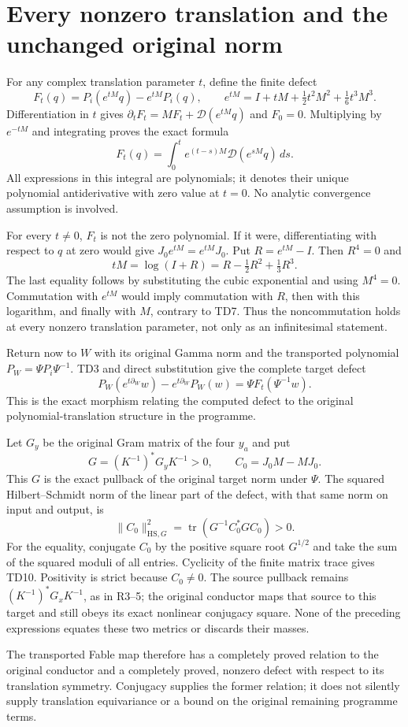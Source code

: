 \documentclass[11pt]{article}
\newcommand{\tr}{\operatorname{tr}}
\begin{document}
\section{Every nonzero translation and the unchanged original norm}
For any complex translation parameter $t$, define the finite defect
\[
 F_t(q)=P_i(e^{tM}q)-e^{tM}P_i(q),\qquad
 e^{tM}=I+tM+\tfrac12t^2M^2+\tfrac16t^3M^3.
\]
Differentiation in $t$ gives
$\partial_tF_t=MF_t+\mathcal D(e^{tM}q)$ and $F_0=0$.
Multiplying by $e^{-tM}$ and integrating proves the exact formula
\begin{equation}
 F_t(q)=\int_0^t e^{(t-s)M}\mathcal D(e^{sM}q)\,ds.\tag{TD8}
\end{equation}
All expressions in this integral are polynomials; it denotes their
unique polynomial antiderivative with zero value at $t=0$. No
analytic convergence assumption is involved.

For every $t\ne0$, $F_t$ is not the zero polynomial. If it were,
differentiating with respect to $q$ at zero would give
$J_0e^{tM}=e^{tM}J_0$. Put $R=e^{tM}-I$. Then $R^4=0$ and
\[
 tM=\log(I+R)=R-\tfrac12R^2+\tfrac13R^3.
\]
The last equality follows by substituting the cubic exponential and
using $M^4=0$. Commutation with $e^{tM}$ would imply commutation
with $R$, then with this logarithm, and finally with $M$, contrary
to TD7. Thus the noncommutation holds at every nonzero translation
parameter, not only as an infinitesimal statement.

Return now to $W$ with its original Gamma norm and the transported
polynomial $P_W=\Psi P_i\Psi^{-1}$. TD3 and direct substitution give
the complete target defect
\begin{equation}
 P_W(e^{t\partial_W}w)-e^{t\partial_W}P_W(w)
 =\Psi F_t(\Psi^{-1}w).\tag{TD9}
\end{equation}
This is the exact morphism relating the computed defect to the
original polynomial-translation structure in the programme.

Let $G_y$ be the original Gram matrix of the four $y_a$ and put
\[
 G=(K^{-1})^*G_yK^{-1}>0,\qquad C_0=J_0M-MJ_0.
\]
This $G$ is the exact pullback of the original target norm under
$\Psi$. The squared Hilbert--Schmidt norm of the linear part of
the defect, with that same norm on input and output, is
\begin{equation}
 \|C_0\|_{\mathrm{HS},G}^2
 =\tr(G^{-1}C_0^*GC_0)>0.\tag{TD10}
\end{equation}
For the equality, conjugate $C_0$ by the positive square root
$G^{1/2}$ and take the sum of the squared moduli of all entries.
Cyclicity of the finite matrix trace gives TD10. Positivity is
strict because $C_0\ne0$. The source pullback remains
$(K^{-1})^*G_xK^{-1}$, as in R3--5; the original conductor maps
that source to this target and still obeys its exact nonlinear
conjugacy square. None of the preceding expressions equates these
two metrics or discards their masses.

The transported Fable map therefore has a completely proved relation
to the original conductor and a completely proved, nonzero defect
with respect to its translation symmetry. Conjugacy supplies the
former relation; it does not silently supply translation equivariance
or a bound on the original remaining programme terms.
\end{document}
